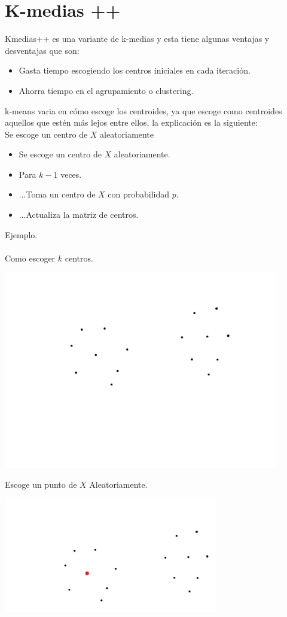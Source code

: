 \documentclass[a4paper]{article}
\begin{document}
\section{K-medias ++}
Kmedias++ es una variante de k-medias y esta tiene algunas ventajas y desventajas que son:
\\
\begin{itemize}
\item Gasta tiempo escogiendo los centros iniciales en cada iteraci\'on.
\item Ahorra tiempo en el agrupamiento o clustering.
\end{itemize}
k-means varia en cómo escoge los centroides, ya que escoge como centroides aquellos que estén m\'as lejos entre ellos, la explicaci\'on es la siguiente:
\\
Se escoge un centro de $X$ aleatoriamente
\begin{itemize}
\item Se escoge un centro de $X$ aleatoriamente.
\item Para $k-1$ veces.
\item ...Toma un centro de $X$ con probabilidad $p$.
\item ...Actualiza la matriz de centros.
\end{itemize}
\newpage
Ejemplo.
\\
\\
Como escoger $k$ centros.
\begin{center}
\includegraphics[width=0.9\textwidth]{puntos.png}
\end{center}
Escoge un punto de $X$ Aleatoriamente.
\begin{center}
\includegraphics[width=0.7\textwidth]{puntos_aleatorios.png}
\end{center}
\end{document}
